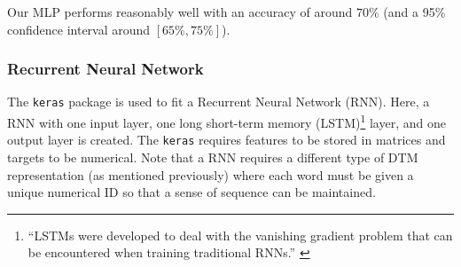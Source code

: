 \documentclass[12pt]{article}
\newenvironment{Shaded}{\begin{snugshade}}{\end{snugshade}}
\newcommand{\CommentTok}[1]{\textcolor[rgb]{0.56,0.35,0.01}{\textit{#1}}}
\newcommand{\DataTypeTok}[1]{\textcolor[rgb]{0.13,0.29,0.53}{#1}}
\newcommand{\DecValTok}[1]{\textcolor[rgb]{0.00,0.00,0.81}{#1}}
\newcommand{\KeywordTok}[1]{\textcolor[rgb]{0.13,0.29,0.53}{\textbf{#1}}}
\newcommand{\NormalTok}[1]{#1}
\newcommand{\OperatorTok}[1]{\textcolor[rgb]{0.81,0.36,0.00}{\textbf{#1}}}
\newcommand{\StringTok}[1]{\textcolor[rgb]{0.31,0.60,0.02}{#1}}
\begin{document}
Our MLP performs reasonably well with an accuracy of around \(70\%\)
(and a 95\% confidence interval around \([65\%, 75\%]\)).

\hypertarget{recurrent-neural-network}{%
\subsubsection{Recurrent Neural
Network}\label{recurrent-neural-network}}

The \texttt{keras} package is used to fit a Recurrent Neural Network
(RNN). Here, a RNN with one input layer, one long short-term memory
(LSTM)\footnote{``LSTMs were developed to deal with the vanishing
  gradient problem that can be encountered when training traditional
  RNNs.'' \citet{LongShorttermMemory2020}} layer, and one output layer
is created. The \texttt{keras} requires features to be stored in
matrices and targets to be numerical. Note that a RNN requires a
different type of DTM representation (as mentioned previously) where
each word must be given a unique numerical ID so that a sense of
sequence can be maintained.

\begin{Shaded}
\end{Shaded}
\end{document}
